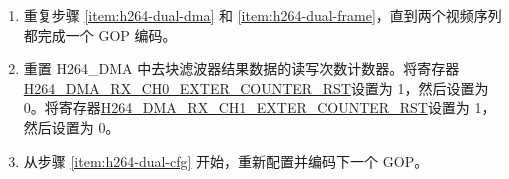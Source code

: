 \documentclass[main\_\_CN.tex]{subfiles}
\begin{document}
\begin{enumerate}
\begin{itemize}
\begin{enumerate}
        \end{enumerate}
        \item 在任何帧编码结束后，可以重新配置以下与当前编码的视频序列对应的寄存器：
        \begin{itemize}
            \item 与量化结果降采样函数相关的寄存器，请参考 \ref{sec:h264-decimate} 章节的描述。
            \item 与宏块级别码率控制功能相关的寄存器，请参考 \ref{sec:h264-rate-ctrl} 章节的描述。
            \item 去块滤波器使能寄存器：\hyperref[fielddesc:H264ABYPASSDBFILTER]{H264\_A\_BYPASS\_DB\_FILTER}。
            \item ROI 功能相关寄存器，请参考 \ref{sec:h264-roi} 章节的描述。
            \item 与切片头信息相关的寄存器：\hyperref[fielddesc:H264SLICEREMAINBIT]{H264\_SLICE\_REMAIN\_BIT}、\hyperref[fielddesc:H264SLICEREMAINBITLENGTH]{H264\_SLICE\_REMAIN\_BITLENGTH}、\hyperref[fielddesc:H264SLICEBYTELENGTH]{H264\_SLICE\_BYTE\_LENGTH}、\hyperref[fielddesc:H264SLICEBYTELSB]{H264\_SLICE\_BYTE\_LSB} 和 \hyperref[fielddesc:H264SLICEBYTEMSB]{H264\_SLICE\_BYTE\_MSB}。
            \item 与 MV 合并功能相关的寄存器，请参考 \ref{sec:h264-mv-merge} 章节的描述。
            \item 与调试功能相关的寄存器，请参考 \ref{sec:h264-debug-func} 章节的描述。
        \end{itemize}
    \end{itemize}
    \item 重复步骤 \ref{item:h264-dual-dma} 和 \ref{item:h264-dual-frame}，直到两个视频序列都完成一个 GOP 编码。
    \item 重置 H264\_DMA 中去块滤波器结果数据的读写次数计数器。将寄存器 \hyperref[fielddesc:H264DMARXCH0EXTERCOUNTERRST]{H264\_DMA\_RX\_CH0\_EXTER\_COUNTER\_RST}设置为 1，然后设置为 0。将寄存器\hyperref[fielddesc:H264DMARXCH1EXTERCOUNTERRST]{H264\_DMA\_RX\_CH1\_EXTER\_COUNTER\_RST}设置为 1，然后设置为 0。
    \item 从步骤 \ref{item:h264-dual-cfg} 开始，重新配置并编码下一个 GOP。
\end{enumerate}
\end{document}
